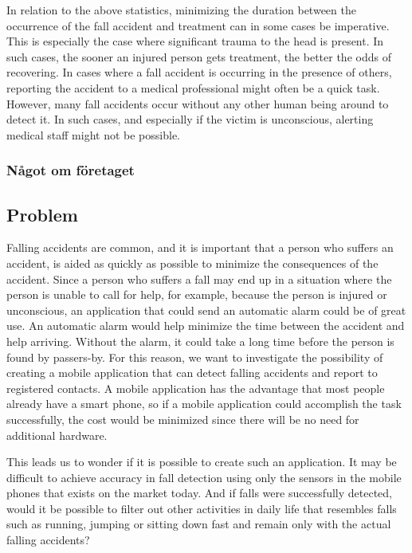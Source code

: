 \documentclass[12pt, a4paper, onecolumn]{article}
\begin{document}
			In relation to the above statistics, minimizing the duration between the occurrence of the fall accident and treatment can in some cases be imperative. This is especially the case where significant trauma to the head is present. In such cases, the sooner an injured person gets treatment, the better the odds of recovering. In cases where a fall accident is occurring in the presence of others, reporting the accident to a medical professional might often be a quick task. However, many fall accidents occur without any other human being around to detect it. In such cases, and especially if the victim is unconscious, alerting medical staff might not be possible.
			
			\subsubsection{Något om företaget}
		
		
		\subsection{Problem}
		
		Falling accidents are common, and it is important that a person who suffers an accident, is aided as quickly as possible to minimize the consequences of the accident. Since a person who suffers a fall may end up in a situation where the person is unable to call for help, for example, because the person is injured or unconscious, an application that could send an automatic alarm could be of great use. An automatic alarm would help minimize the time between the accident and help arriving. Without the alarm, it could take a long time before the person is found by passers-by. For this reason, we want to investigate the possibility of creating a mobile application that can detect falling accidents and report to registered contacts. A mobile application has the advantage that most people already have a smart phone, so if a mobile application could accomplish the task successfully, the cost would be minimized since there will be no need for additional hardware.
		
		This leads us to wonder if it is possible to create such an application. It may be difficult to achieve accuracy in fall detection using only the sensors in the mobile phones that exists on the market today. And if falls were successfully detected, would it be possible to filter out other activities in daily life that resembles falls such as running, jumping or sitting down fast and remain only with the actual falling accidents?
		
\end{document}
